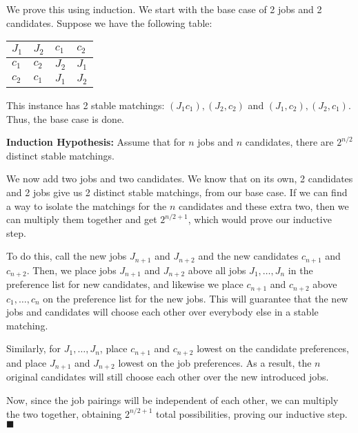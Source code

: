 \documentclass[11pt]{article}
\begin{document}
\begin{solution}
    We prove this using induction. We start with the base case of 2 jobs and 2 candidates. Suppose we have the following table:

    \begin{center}
      \begin{tabular}{ll|ll}
          $J_1$ & $J_2$ & $c_1$ & $c_2$ \\ \hline
          $c_1$ & $c_2$ & $J_2$ & $J_1$ \\
          $c_2$ & $c_1$ & $J_1$ & $J_2$
      \end{tabular}
    \end{center}

    This instance has 2 stable matchings: $(J_1 c_1), (J_2, c_2)$ and $(J_1, c_2), (J_2, c_1)$. Thus, the base case is done. 


    \textbf{Induction Hypothesis:} Assume that for $n$ jobs and $n$ candidates, there are $2^{n/2}$ distinct stable matchings. 

    We now add two jobs and two candidates. We know that on its own, 2 candidates and 2 jobs give us 2 distinct stable matchings, from our base case. If we can find a way to isolate the matchings for the $n$ candidates and these extra two, then we can multiply them together and get $2^{n/2 + 1}$, which would prove our inductive step. 

    To do this, call the new jobs $J_{n+1}$ and $J_{n+2}$ and the new candidates $c_{n+1}$ and $c_{n+2}$. Then, we place jobs $J_{n+1}$ and $J_{n+2}$ above all jobs $J_1, \dots, J_n$ in the preference list for new candidates, and likewise we place $c_{n+1}$ and $c_{n+2}$ above $c_1, \dots, c_n$ on the preference list for the new jobs. This will guarantee that the new jobs and candidates will choose each other over everybody else in a stable matching.

    Similarly, for $J_1, \dots, J_n$, place $c_{n+1}$ and $c_{n+2}$ lowest on the candidate preferences, and place $J_{n+1}$ and $J_{n+2}$ lowest on the job preferences. As a result, the $n$ original candidates will still choose each other over the new introduced jobs. 

    Now, since the job pairings will be independent of each other, we can multiply the two together, obtaining $2^{n/2 +1}$ total possibilities, proving our inductive step. $\blacksquare$
\end{solution}

\pagebreak
{}
\end{document}

